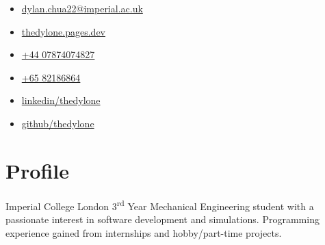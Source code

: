 \documentclass{cv}
\begin{document}
\begin{minipage}[h]{.33\textwidth-0.33\margin}
    \begin{itemize}
        \setlength{\itemsep}{0.5em}
        \item[\Large\faAt] \href{mailto:dylan.chua22@imperial.ac.uk}{dylan.chua22@imperial.ac.uk}
        \item[\Large\faLaptop] \href{https://thedylone.pages.dev}{thedylone.pages.dev}
    \end{itemize}
\end{minipage}
\hfill
\begin{minipage}[h]{.33\textwidth-0.33\margin}
    \vspace{0.5em}
    \begin{itemize}
        \centering
        \setlength{\itemsep}{0.5em}
        \item[\Large\faMobile] \href{tel:4407874074827}{+44 07874074827}
        \item[\Large\faMobile] \href{tel:6582186864}{+65 82186864}
    \end{itemize}
\end{minipage}
\hfill
\begin{minipage}[h]{.33\textwidth-0.33\margin}
    \vspace{0.5em}
    \begin{itemize}
        \raggedleft
        \setlength{\itemsep}{0.5em}
        \item[\Large\faLinkedinSquare] \href{https://www.linkedin.com/in/thedylone/}{linkedin/thedylone}
        \item[\Large\faGithub] \href{https://github.com/thedylone}{github/thedylone}
    \end{itemize}
\end{minipage}

\section{Profile}
\raggedright
Imperial College London 3\textsuperscript{rd} Year Mechanical Engineering student with a passionate interest in software development and simulations. Programming experience gained from internships and hobby/part-time projects.
\end{document}
